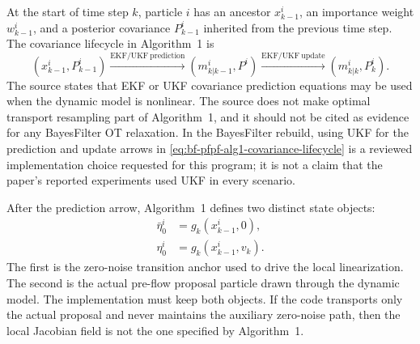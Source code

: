 At the start of time step $k$, particle $i$ has an ancestor
$x_{k-1}^i$, an importance weight $w_{k-1}^i$, and a posterior covariance
$P_{k-1}^i$ inherited from the previous time step.  The covariance lifecycle in
Algorithm~1 is
\begin{equation}
\label{eq:bf-pfpf-alg1-covariance-lifecycle}
  (x_{k-1}^i,P_{k-1}^i)
  \xrightarrow{\mathrm{EKF/UKF\ prediction}}
  (m_{k|k-1}^i,P^i)
  \xrightarrow{\mathrm{EKF/UKF\ update}}
  (m_{k|k}^i,P_k^i).
\end{equation}
The source states that EKF or UKF covariance prediction equations may be used
when the dynamic model is nonlinear.  The source does not make optimal
transport resampling part of Algorithm~1, and it should not be cited as
evidence for any BayesFilter OT relaxation.  In the BayesFilter rebuild, using
UKF for the prediction and update arrows in
\eqref{eq:bf-pfpf-alg1-covariance-lifecycle} is a reviewed implementation
choice requested for this program; it is not a claim that the paper's reported
experiments used UKF in every scenario.

After the prediction arrow, Algorithm~1 defines two distinct state objects:
\begin{align}
\label{eq:bf-pfpf-alg1-zero-noise-anchor}
  \bar\eta_0^i &= g_k(x_{k-1}^i,0),\\
\label{eq:bf-pfpf-alg1-preflo-sample}
  \eta_0^i &= g_k(x_{k-1}^i,v_k).
\end{align}
The first is the zero-noise transition anchor used to drive the local
linearization.  The second is the actual pre-flow proposal particle drawn
through the dynamic model.  The implementation must keep both objects.  If the
code transports only the actual proposal and never maintains the auxiliary
zero-noise path, then the local Jacobian field is not the one specified by
Algorithm~1.


